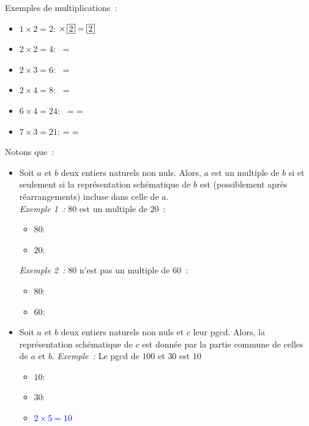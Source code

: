 Exemples de multiplications : 
\begin{multicols}{2}
\begin{itemize}[nosep]
    \item $1 \times 2 = 2$: $\times \, \inbox{2} = \inbox{2}$
    \item $2 \times 2 = 4$:  \times \, = 
    \item $2 \times 3 = 6$:  \times \, = 
    \item $2 \times 4 = 8$:  \times \, = 
    \item $6 \times 4 = 24$:  \times \, =  = 
    \item $7 \times 3 = 21$:  \times {} =  = 
\end{itemize}
\end{multicols}

Notons que : 
\begin{itemize}[nosep]
    \item Soit $a$ et $b$ deux entiers naturels non nuls.
        Alors, $a$ est un multiple de $b$ si et seulement si la représentation schématique de $b$ est (possiblement après réarrangements) incluse dans celle de $a$. \\
        \textit{Exemple 1 :} $80$ est un multiple de $20$ :
        \begin{itemize}[nosep]
            \item $80$: \textcolor{blue}{}
            \item $20$: \textcolor{blue}{}
        \end{itemize}
        \textit{Exemple 2 :} $80$ n'est pas un multiple de $60$ :
        \begin{itemize}[nosep]
            \item $80$: \textcolor{blue}{}
            \item $60$: \textcolor{blue}{}\textcolor{red}{}
        \end{itemize}
    \item Soit $a$ et $b$ deux entiers naturels non nuls et $c$ leur pgcd.
        Alors, la représentation schématique de $c$ est donnée par la partie commune de celles de $a$ et $b$.
        \textit{Exemple :} Le pgcd de $100$ et $30$ est $10$
        \begin{itemize}[nosep]
            \item $10$: \textcolor{blue}{}\textcolor{green!50!black}{}
            \item $30$: \textcolor{blue}{}\textcolor{red}{}
            \item \textcolor{blue}{$2 \times 5 = 10$}
        \end{itemize}
\end{itemize}

